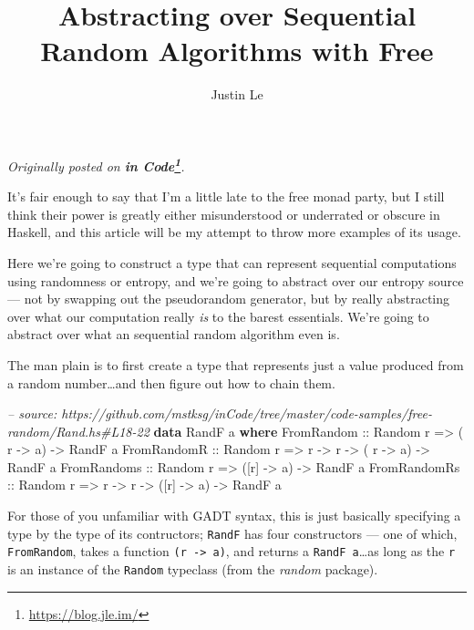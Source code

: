\documentclass[]{article}
\title{Abstracting over Sequential Random Algorithms with Free}
\author{Justin Le}
\newenvironment{Shaded}{}{}
\newcommand{\KeywordTok}[1]{\textcolor[rgb]{0.00,0.44,0.13}{\textbf{{#1}}}}
\newcommand{\DataTypeTok}[1]{\textcolor[rgb]{0.56,0.13,0.00}{{#1}}}
\newcommand{\CommentTok}[1]{\textcolor[rgb]{0.38,0.63,0.69}{\textit{{#1}}}}
\newcommand{\OtherTok}[1]{\textcolor[rgb]{0.00,0.44,0.13}{{#1}}}
\newcommand{\NormalTok}[1]{{#1}}
\renewcommand{\href}[2]{#2\footnote{\url{#1}}}
\begin{document}
\maketitle

\emph{Originally posted on \textbf{\href{https://blog.jle.im/}{in
Code}}.}

It's fair enough to say that I'm a little late to the free monad party,
but I still think their power is greatly either misunderstood or
underrated or obscure in Haskell, and this article will be my attempt to
throw more examples of its usage.

Here we're going to construct a type that can represent sequential
computations using randomness or entropy, and we're going to abstract
over our entropy source --- not by swapping out the pseudorandom
generator, but by really abstracting over what our computation really
\emph{is} to the barest essentials. We're going to abstract over what an
sequential random algorithm even is.

The man plain is to first create a type that represents just a value
produced from a random number\ldots{}and then figure out how to chain
them.

\begin{Shaded}
\begin{Highlighting}[]
\CommentTok{-- source: https://github.com/mstksg/inCode/tree/master/code-samples/free-random/Rand.hs#L18-22}
\KeywordTok{data} \DataTypeTok{RandF} \NormalTok{a }\KeywordTok{where}
    \DataTypeTok{FromRandom}\OtherTok{   ::} \DataTypeTok{Random} \NormalTok{r }\OtherTok{=>}           \NormalTok{( r  }\OtherTok{->} \NormalTok{a) }\OtherTok{->} \DataTypeTok{RandF} \NormalTok{a}
    \DataTypeTok{FromRandomR}\OtherTok{  ::} \DataTypeTok{Random} \NormalTok{r }\OtherTok{=>} \NormalTok{r }\OtherTok{->} \NormalTok{r }\OtherTok{->} \NormalTok{( r  }\OtherTok{->} \NormalTok{a) }\OtherTok{->} \DataTypeTok{RandF} \NormalTok{a}
    \DataTypeTok{FromRandoms}\OtherTok{  ::} \DataTypeTok{Random} \NormalTok{r }\OtherTok{=>}           \NormalTok{([r] }\OtherTok{->} \NormalTok{a) }\OtherTok{->} \DataTypeTok{RandF} \NormalTok{a}
    \DataTypeTok{FromRandomRs}\OtherTok{ ::} \DataTypeTok{Random} \NormalTok{r }\OtherTok{=>} \NormalTok{r }\OtherTok{->} \NormalTok{r }\OtherTok{->} \NormalTok{([r] }\OtherTok{->} \NormalTok{a) }\OtherTok{->} \DataTypeTok{RandF} \NormalTok{a}
\end{Highlighting}
\end{Shaded}

For those of you unfamiliar with GADT syntax, this is just basically
specifying a type by the type of its contructors; \texttt{RandF} has
four constructors --- one of which, \texttt{FromRandom}, takes a
function \texttt{(r\ -\textgreater{}\ a)}, and returns a
\texttt{RandF\ a}\ldots{}as long as the \texttt{r} is an instance of the
\texttt{Random} typeclass (from the \emph{random} package).
\end{document}
